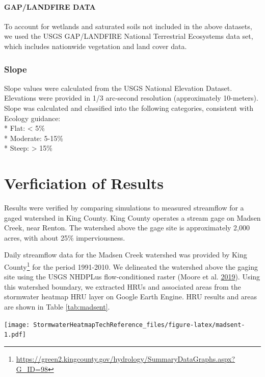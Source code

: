\documentclass[
]{report}
\begin{document}
\hypertarget{gaplandfire-data}{%
\paragraph{GAP/LANDFIRE DATA}\label{gaplandfire-data}}

To account for wetlands and saturated soils not included in the above datasets, we used the USGS GAP/LANDFIRE National Terrestrial Ecosystems data set, which includes nationwide vegetation and land cover data.

\hypertarget{slope}{%
\subsubsection{Slope}\label{slope}}

Slope values were calculated from the USGS National Elevation Dataset. Elevations were provided in 1/3 arc-second resolution (approximately 10-meters). Slope was calculated and classified into the following categories, consistent with Ecology guidance:\\
* Flat: \textless{} 5\%\\
* Moderate: 5-15\%\\
* Steep: \textgreater{} 15\%

\hypertarget{verficiation-of-results}{%
\section{Verficiation of Results}\label{verficiation-of-results}}

Results were verified by comparing simulations to measured streamflow for a gaged watershed in King County. King County operates a stream gage on Madsen Creek, near Renton. The watershed above the gage site is approximately 2,000 acres, with about 25\% imperviousness.

Daily streamflow data for the Madsen Creek watershed was provided by King County\footnote{\url{https://green2.kingcounty.gov/hydrology/SummaryDataGraphs.aspx?G_ID=98}} for the period 1991-2010. We delineated the watershed above the gaging site using the USGS NHDPLus flow-conditioned raster (Moore et al. \protect\hyperlink{ref-moore2019user}{2019}).
Using this watershed boundary, we extracted HRUs and associated areas from the stormwater heatmap HRU layer on Google Earth Engine. HRU results and areas are shown in Table \ref{tab:madsent}.

\texttt{[image: StormwaterHeatmapTechReference\_files/figure-latex/madsent-1.pdf]}
\end{document}
